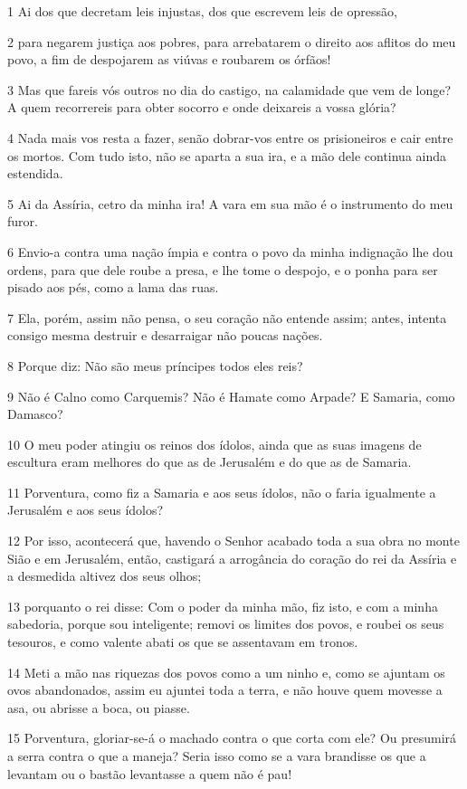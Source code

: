 \par 1 Ai dos que decretam leis injustas, dos que escrevem leis de opressão,
\par 2 para negarem justiça aos pobres, para arrebatarem o direito aos aflitos do meu povo, a fim de despojarem as viúvas e roubarem os órfãos!
\par 3 Mas que fareis vós outros no dia do castigo, na calamidade que vem de longe? A quem recorrereis para obter socorro e onde deixareis a vossa glória?
\par 4 Nada mais vos resta a fazer, senão dobrar-vos entre os prisioneiros e cair entre os mortos. Com tudo isto, não se aparta a sua ira, e a mão dele continua ainda estendida.
\par 5 Ai da Assíria, cetro da minha ira! A vara em sua mão é o instrumento do meu furor.
\par 6 Envio-a contra uma nação ímpia e contra o povo da minha indignação lhe dou ordens, para que dele roube a presa, e lhe tome o despojo, e o ponha para ser pisado aos pés, como a lama das ruas.
\par 7 Ela, porém, assim não pensa, o seu coração não entende assim; antes, intenta consigo mesma destruir e desarraigar não poucas nações.
\par 8 Porque diz: Não são meus príncipes todos eles reis?
\par 9 Não é Calno como Carquemis? Não é Hamate como Arpade? E Samaria, como Damasco?
\par 10 O meu poder atingiu os reinos dos ídolos, ainda que as suas imagens de escultura eram melhores do que as de Jerusalém e do que as de Samaria.
\par 11 Porventura, como fiz a Samaria e aos seus ídolos, não o faria igualmente a Jerusalém e aos seus ídolos?
\par 12 Por isso, acontecerá que, havendo o Senhor acabado toda a sua obra no monte Sião e em Jerusalém, então, castigará a arrogância do coração do rei da Assíria e a desmedida altivez dos seus olhos;
\par 13 porquanto o rei disse: Com o poder da minha mão, fiz isto, e com a minha sabedoria, porque sou inteligente; removi os limites dos povos, e roubei os seus tesouros, e como valente abati os que se assentavam em tronos.
\par 14 Meti a mão nas riquezas dos povos como a um ninho e, como se ajuntam os ovos abandonados, assim eu ajuntei toda a terra, e não houve quem movesse a asa, ou abrisse a boca, ou piasse.
\par 15 Porventura, gloriar-se-á o machado contra o que corta com ele? Ou presumirá a serra contra o que a maneja? Seria isso como se a vara brandisse os que a levantam ou o bastão levantasse a quem não é pau!
